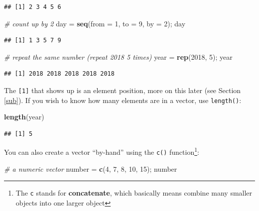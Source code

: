 \documentclass[]{book}
\newenvironment{Shaded}{\begin{snugshade}}{\end{snugshade}}
\newcommand{\CommentTok}[1]{\textcolor[rgb]{0.56,0.35,0.01}{\textit{#1}}}
\newcommand{\DataTypeTok}[1]{\textcolor[rgb]{0.13,0.29,0.53}{#1}}
\newcommand{\DecValTok}[1]{\textcolor[rgb]{0.00,0.00,0.81}{#1}}
\newcommand{\KeywordTok}[1]{\textcolor[rgb]{0.13,0.29,0.53}{\textbf{#1}}}
\newcommand{\NormalTok}[1]{#1}
\newcommand{\StringTok}[1]{\textcolor[rgb]{0.31,0.60,0.02}{#1}}
\let\rmarkdownfootnote\footnote%
\def\footnote{\protect\rmarkdownfootnote}
\begin{document}
\begin{verbatim}
## [1] 2 3 4 5 6
\end{verbatim}

\begin{Shaded}
\begin{Highlighting}[]
\CommentTok{# count up by 2}
\NormalTok{day =}\StringTok{ }\KeywordTok{seq}\NormalTok{(}\DataTypeTok{from =} \DecValTok{1}\NormalTok{, }\DataTypeTok{to =} \DecValTok{9}\NormalTok{, }\DataTypeTok{by =} \DecValTok{2}\NormalTok{); day}
\end{Highlighting}
\end{Shaded}

\begin{verbatim}
## [1] 1 3 5 7 9
\end{verbatim}

\begin{Shaded}
\begin{Highlighting}[]
\CommentTok{# repeat the same number (repeat 2018 5 times)}
\NormalTok{year =}\StringTok{ }\KeywordTok{rep}\NormalTok{(}\DecValTok{2018}\NormalTok{, }\DecValTok{5}\NormalTok{); year}
\end{Highlighting}
\end{Shaded}

\begin{verbatim}
## [1] 2018 2018 2018 2018 2018
\end{verbatim}

The \texttt{{[}1{]}} that shows up is an element position, more on this later (see Section \ref{sub}). If you wish to know how many elements are in a vector, use \texttt{length()}:

\begin{Shaded}
\begin{Highlighting}[]
\KeywordTok{length}\NormalTok{(year)}
\end{Highlighting}
\end{Shaded}

\begin{verbatim}
## [1] 5
\end{verbatim}

You can also create a vector ``by-hand'' using the \texttt{c()} function\footnote{The \texttt{c} stands for \textbf{concatenate}, which basically means combine many smaller objects into one larger object}:

\begin{Shaded}
\begin{Highlighting}[]
\CommentTok{# a numeric vector}
\NormalTok{number =}\StringTok{ }\KeywordTok{c}\NormalTok{(}\DecValTok{4}\NormalTok{, }\DecValTok{7}\NormalTok{, }\DecValTok{8}\NormalTok{, }\DecValTok{10}\NormalTok{, }\DecValTok{15}\NormalTok{); number}
\end{Highlighting}
\end{Shaded}
\end{document}
